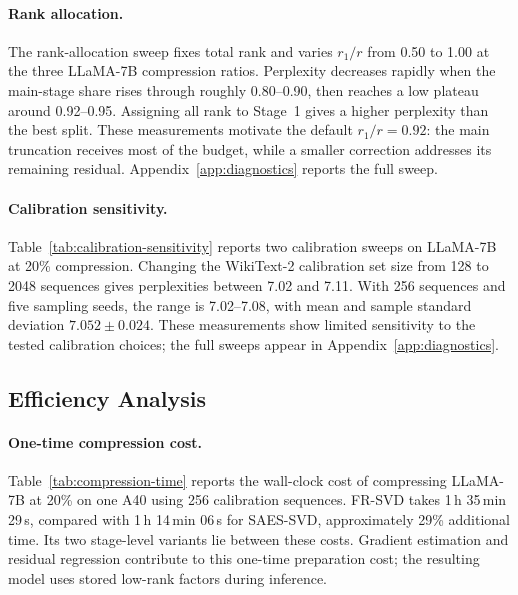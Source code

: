 \documentclass[11pt]{article}
\begin{document}
\paragraph{Rank allocation.}
The rank-allocation sweep fixes total rank and varies $r_1/r$ from 0.50 to 1.00 at the three LLaMA-7B compression ratios. Perplexity decreases rapidly when the main-stage share rises through roughly 0.80--0.90, then reaches a low plateau around 0.92--0.95. Assigning all rank to Stage~1 gives a higher perplexity than the best split. These measurements motivate the default $r_1/r=0.92$: the main truncation receives most of the budget, while a smaller correction addresses its remaining residual. Appendix~\ref{app:diagnostics} reports the full sweep.

\paragraph{Calibration sensitivity.}


Table~\ref{tab:calibration-sensitivity} reports two calibration sweeps on LLaMA-7B at 20\% compression. Changing the WikiText-2 calibration set size from 128 to 2048 sequences gives perplexities between 7.02 and 7.11. With 256 sequences and five sampling seeds, the range is 7.02--7.08, with mean and sample standard deviation $7.052\pm0.024$. These measurements show limited sensitivity to the tested calibration choices; the full sweeps appear in Appendix~\ref{app:diagnostics}.

\subsection{Efficiency Analysis}\label{sec:efficiency}

\paragraph{One-time compression cost.}
Table~\ref{tab:compression-time} reports the wall-clock cost of compressing LLaMA-7B at 20\% on one A40 using 256 calibration sequences. FR-SVD takes 1\,h 35\,min 29\,s, compared with 1\,h 14\,min 06\,s for SAES-SVD, approximately 29\% additional time. Its two stage-level variants lie between these costs. Gradient estimation and residual regression contribute to this one-time preparation cost; the resulting model uses stored low-rank factors during inference.


\end{document}
